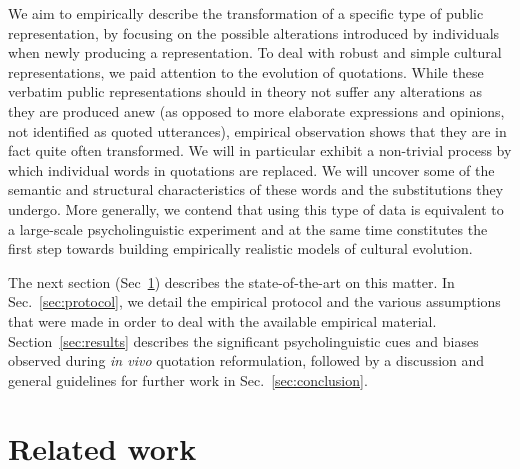 We aim to empirically describe the transformation of a specific type of public representation, by focusing on the possible alterations introduced by individuals when newly producing a representation.
To deal with robust and simple cultural representations, we paid attention to the evolution of quotations.
While these verbatim public representations should in theory not suffer any alterations as they are produced anew (as opposed to more elaborate expressions and opinions, not identified as quoted utterances), empirical observation shows that they are in fact quite often transformed.
We will in particular exhibit a non-trivial process by which individual words in quotations are replaced.
We will uncover some of the semantic and structural characteristics of these words and the substitutions they undergo.
More generally, we contend that using this type of data is equivalent to a large-scale psycholinguistic experiment and at the same time constitutes the first step towards building empirically realistic models of cultural evolution. 

The next section (Sec~\ref{sec:related}) describes the state-of-the-art on this matter.
In Sec.~\ref{sec:protocol}, we detail the empirical protocol and the various assumptions that were made in order to deal with the available empirical material.
Section~\ref{sec:results} describes the significant psycholinguistic cues and biases observed during \emph{in vivo} quotation reformulation, followed by a discussion and general guidelines for further work in Sec.~\ref{sec:conclusion}.

\section{Related work} %
\label{sec:related}


